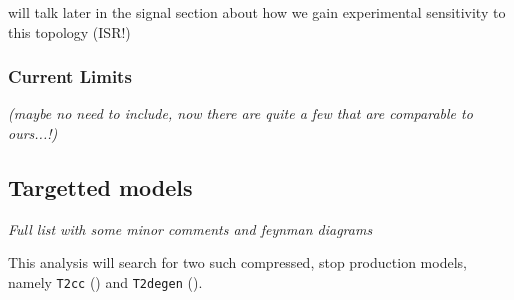 will talk later in the signal section about how we gain experimental sensitivity
to this topology (ISR!)

\subsubsection{Current Limits}
\emph{(maybe no need to include, now there are quite a few that are comparable
to
ours...!)}

\subsection{Targetted models}
\emph{Full list with some minor comments and feynman diagrams}

This analysis will search for two such compressed, stop production models,
namely \texttt{T2cc} (\Ttwocc) and \texttt{T2degen} (\Ttwodegen).